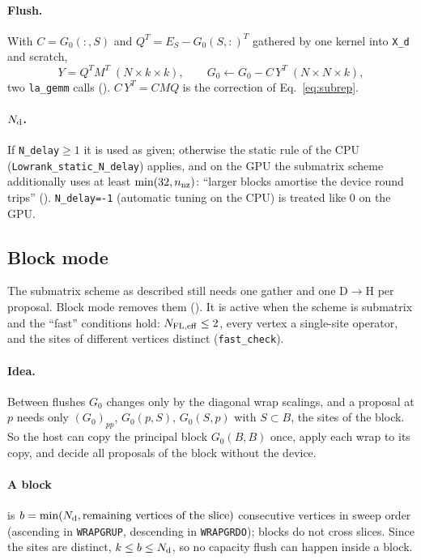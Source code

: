 \paragraph{Flush.} With $C=G_0(:,S)$ and $Q^T=E_S-G_0(S,:)^T$ gathered by one kernel into \texttt{X\_d} and scratch,
\begin{equation}
Y = Q^T M^T \;(N\times k\times k),\qquad G_0\leftarrow G_0 - C\,Y^T\;(N\times N\times k),
\end{equation}
two \texttt{la\_gemm} calls (). $C\,Y^T=CMQ$ is the correction of Eq.~\eqref{eq:subrep}.

\paragraph{$N_{\rm d}$.} If \texttt{N\_delay}$\ge1$ it is used as given; otherwise the static rule of the CPU (\texttt{Lowrank\_static\_N\_delay}) applies, and on the GPU the submatrix scheme additionally uses at least $\min(32,n_{\rm nz})$: ``larger blocks amortise the device round trips'' (). \texttt{N\_delay=-1} (automatic tuning on the CPU) is treated like 0 on the GPU.

\subsection{Block mode}

The submatrix scheme as described still needs one gather and one D$\to$H per proposal. Block mode removes them (). It is active when the scheme is submatrix and the ``fast'' conditions hold: $N_{\rm FL,eff}\le2$, every vertex a single-site operator, and the sites of different vertices distinct (\texttt{fast\_check}).

\paragraph{Idea.} Between flushes $G_0$ changes only by the diagonal wrap scalings, and a proposal at $p$ needs only $(G_0)_{pp}$, $G_0(p,S)$, $G_0(S,p)$ with $S\subset B$, the sites of the block. So the host can copy the principal block $G_0(B,B)$ once, apply each wrap to its copy, and decide all proposals of the block without the device.

\paragraph{A block} is $b=\min(N_{\rm d},\text{remaining vertices of the slice})$ consecutive vertices in sweep order (ascending in \texttt{WRAPGRUP}, descending in \texttt{WRAPGRDO}); blocks do not cross slices. Since the sites are distinct, $k\le b\le N_{\rm d}$, so no capacity flush can happen inside a block.

